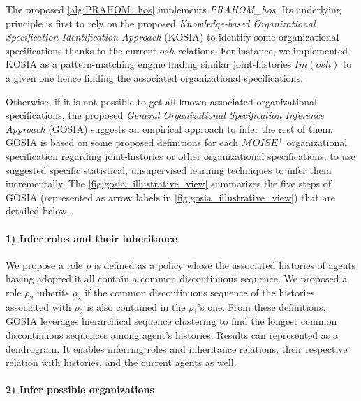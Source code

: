 \documentclass[runningheads]{llncs}
\newcounter{relation}
\begin{document}
The proposed \autoref{alg:PRAHOM_hos} implements \emph{PRAHOM\_hos}. Its underlying principle is first to rely on the proposed \emph{Knowledge-based Organizational Specification Identification Approach} (KOSIA) to identify some organizational specifications thanks to the current $osh$ relations. %
For instance, we implemented KOSIA as a pattern-matching engine finding similar joint-histories $Im(osh)$ to a given one hence finding the associated organizational specifications.

Otherwise, if it is not possible to get all known associated organizational specifications, the proposed \emph{General Organizational Specification Inference Approach} (GOSIA) suggests an empirical approach to infer the rest of them.
GOSIA is based on some proposed definitions for each $\mathcal{M}OISE^+$ organizational specification regarding joint-histories or other organizational specifications, to use suggested specific statistical, unsupervised learning techniques to infer them incrementally. The \autoref{fig:gosia_illustrative_view} summarizes the five steps of GOSIA (represented as arrow labels in \autoref{fig:gosia_illustrative_view}) that are detailed below.
%
\paragraph{1) Infer roles and their inheritance}

We propose a role $\rho$ is defined as a policy whose the associated histories of agents having adopted it all contain a common discontinuous sequence. We proposed a role $\rho_2$ inherits $\rho_2$ if the common discontinuous sequence of the histories associated with $\rho_2$ is also contained in the $\rho_1$'s one.
From these definitions, GOSIA leverages hierarchical sequence clustering to find the longest common discontinuous sequences among agent's histories. Results can represented as a dendrogram. It enables inferring roles and inheritance relations, their respective relation with histories, and the current agents as well.

\paragraph{2) Infer possible organizations}
\end{document}
